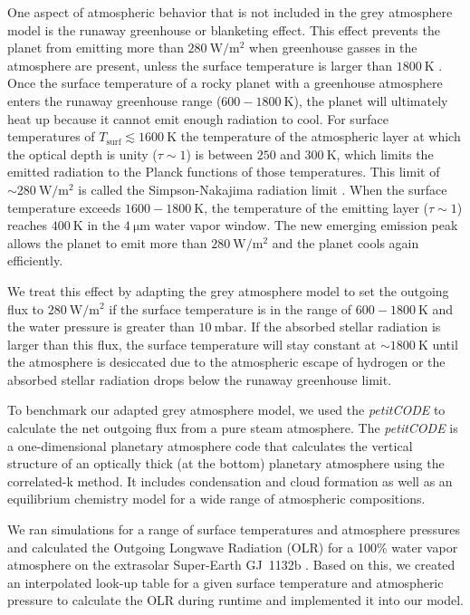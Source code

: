 \documentclass[oneside,twocolumn]{article}
\newcommand{\petit}{\textit{petitCODE}}
\begin{document}
One aspect of atmospheric behavior that is not included in the grey atmosphere model is the runaway greenhouse or blanketing effect. This effect prevents the planet from emitting more than $\SI{280}{\watt\per\square\metre}$ when greenhouse gasses in the atmosphere are present, unless the surface temperature is larger than $\SI{1800}{\kelvin}$ \citep{Goldblatt2013, Kopparapu2013}.
Once the surface temperature of a rocky planet with a greenhouse atmosphere enters the runaway greenhouse range ($600-\SI{1800}{\kelvin}$), the planet will ultimately heat up because it cannot emit enough radiation to cool.
For surface temperatures of $T_\mathrm{surf} \lesssim \SI{1600}{\kelvin}$ the temperature of the atmospheric layer at which the optical depth is unity ($\tau \sim 1$) is between $250$ and $\SI{300}{\kelvin}$, which limits the emitted radiation to the Planck functions of those temperatures.
This limit of $\sim \SI{280}{\watt\per\square\metre}$ is called the Simpson-Nakajima radiation limit \citep{Simpson1928, Nakajima1992}.
When the surface temperature exceeds $1600 - \SI{1800}{\kelvin}$, the temperature of the emitting layer ($\tau \sim 1$) reaches $\SI{400}{\kelvin}$ in the $\SI{4}{\micro\metre}$ water vapor window.
The new emerging emission peak allows the planet to emit more than $\SI{280}{\watt\per\square\metre}$ and the planet cools again efficiently.

We treat this effect by adapting the grey atmosphere model to set the outgoing flux to $\SI{280}{\watt\per\square\metre}$ if the surface temperature is in the range of $600-\SI{1800}{\kelvin}$ and the water pressure is greater than $\SI{10}{\milli\bar}$.
If the absorbed stellar radiation is larger than this flux, the surface temperature will stay constant at $\sim \SI{1800}{\kelvin}$ until the atmosphere is desiccated due to the atmospheric escape of hydrogen or the absorbed stellar radiation drops below the runaway greenhouse limit.

To benchmark our adapted grey atmosphere model, we used the \petit{} \citep{Molliere2015,Molliere2017} to calculate the net outgoing flux from a pure steam atmosphere.
The \petit{} is a one-dimensional planetary atmosphere code that calculates the vertical structure of an optically thick (at the bottom) planetary atmosphere using the correlated-k method.
It includes condensation and cloud formation as well as an equilibrium chemistry model for a wide range of atmospheric compositions.

We ran simulations for a range of surface temperatures and atmosphere pressures and calculated the Outgoing Longwave Radiation (OLR) for a 100\% water vapor atmosphere on the extrasolar Super-Earth GJ~1132b \citep{Berta-Thompson2015}. Based on this, we created an interpolated look-up table for a given surface temperature and atmospheric pressure to calculate the OLR during runtime and implemented it into our model.
\end{document}
